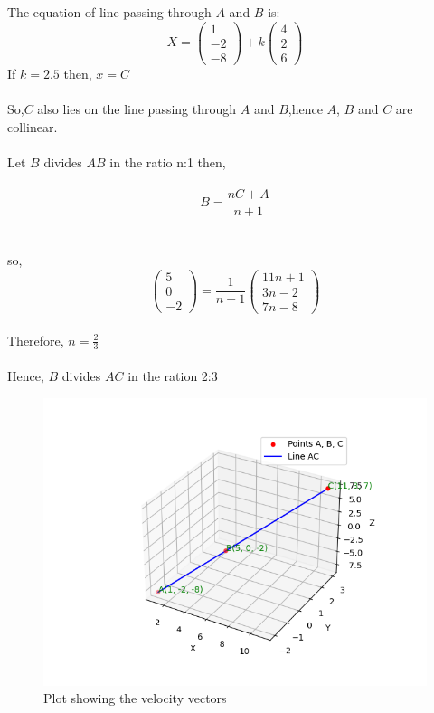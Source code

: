 \documentclass[journal]{IEEEtran}
\begin{document}
The equation of line passing through $A$ and $B$ is:\\
\begin{equation}
    X = \begin{pmatrix}
        1\\
        -2\\
        -8
    \end{pmatrix}+k\begin{pmatrix}
        4\\
        2\\
        6
    \end{pmatrix}
\end{equation}
If $k=2.5$ then, $x=C$\\
\\
So,$C$ also lies on the line passing through $A$ and $B$,hence $A$, $B$ and $C$ are collinear.\\
\\
Let $B$ divides $AB$ in the ratio n:1 then,\\
\\
\begin{equation}
    B = \frac{nC+A}{n+1}
\end{equation}\\
\\
so,\\
\begin{equation}
    \begin{pmatrix}
        5\\
        0\\
        -2
    \end{pmatrix}=\frac{1}{n+1}\begin{pmatrix}
        11n+1\\
        3n-2\\
        7n-8
    \end{pmatrix}
\end{equation}\\
Therefore, $n = \frac{2}{3}$\\
\\
Hence, $B$ divides $AC$ in the ration 2:3
  \begin{figure}[!ht]
    \centering
    \includegraphics[width=0.7\linewidth]{figs/figure1.png}
    \caption{Plot showing the velocity vectors}
    \label{stemplot}
 \end{figure}
\end{document}
